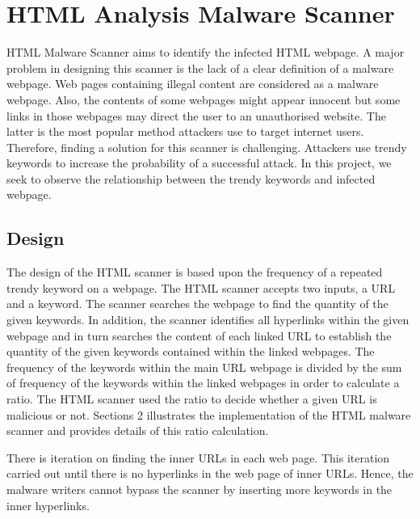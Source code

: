 \section{HTML Analysis Malware Scanner}

HTML Malware Scanner aims to identify the infected HTML webpage. A major problem in designing this scanner is the lack of a clear definition of a malware webpage. Web pages containing illegal content are considered as a malware webpage. Also, the contents of some webpages might appear innocent but some links in those webpages may direct the user to an unauthorised website. The latter is the most popular method attackers use to target internet users. Therefore, finding a solution for this scanner is challenging. Attackers use trendy keywords to increase the probability of a successful attack. In this project, we seek to observe the relationship between the trendy keywords and infected webpage.

\subsection{Design}

The design of the HTML scanner is based upon the frequency of a repeated trendy keyword on a webpage. The HTML scanner accepts two inputs, a URL and a keyword. The scanner searches the webpage to find the quantity of the given keywords. In addition, the scanner identifies all hyperlinks within the given webpage and in turn searches the content of each linked URL to establish the quantity of the given keywords contained within the linked webpages. The frequency of the keywords within the main URL webpage is divided by the sum of frequency of the keywords within the linked webpages in order to calculate a ratio. The HTML scanner used the ratio to decide whether a given URL is malicious or not. Sections 2 illustrates the implementation of the HTML malware scanner and provides details of this ratio calculation.

There is iteration on finding the inner URLs in each web page. This iteration carried out until there is no hyperlinks in the web page of inner URLs. Hence, the malware writers cannot bypass the scanner by inserting more keywords in the inner hyperlinks. 
